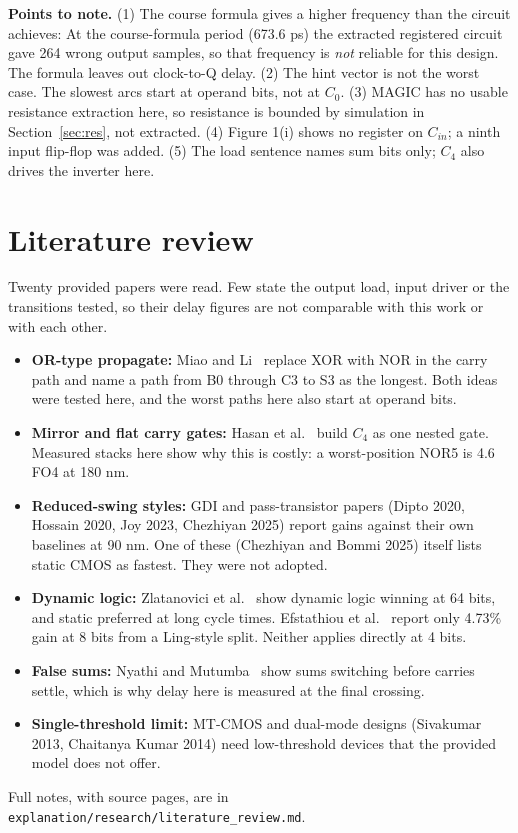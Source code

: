 \documentclass[10pt,a4paper]{article}
\begin{document}
\noindent\textbf{Points to note.} (1) The course formula gives a higher frequency than the circuit achieves: At the course-formula period (673.6 ps) the extracted registered circuit gave 264 wrong output samples, so that frequency is \emph{not} reliable for this design. The formula leaves out clock-to-Q delay. (2) The hint vector is not the worst case. The slowest arcs start at operand bits, not at $C_0$. (3) MAGIC has no usable resistance extraction here, so resistance is bounded by simulation in Section~\ref{sec:res}, not extracted. (4) Figure 1(i) shows no register on $C_{in}$; a ninth input flip-flop was added. (5) The load sentence names sum bits only; $C_4$ also drives the inverter here.

\section{Literature review}
Twenty provided papers were read. Few state the output load, input driver or the transitions tested, so their delay figures are not comparable with this work or with each other.
\begin{itemize}
\item \textbf{OR-type propagate:} Miao and Li~\cite{miao} replace XOR with NOR in the carry path and name a path from B0 through C3 to S3 as the longest. Both ideas were tested here, and the worst paths here also start at operand bits.
\item \textbf{Mirror and flat carry gates:} Hasan et al.~\cite{hasan} build $C_4$ as one nested gate. Measured stacks here show why this is costly: a worst-position NOR5 is 4.6 FO4 at 180 nm.
\item \textbf{Reduced-swing styles:} GDI and pass-transistor papers (Dipto 2020, Hossain 2020, Joy 2023, Chezhiyan 2025) report gains against their own baselines at 90 nm. One of these (Chezhiyan and Bommi 2025) itself lists static CMOS as fastest. They were not adopted.
\item \textbf{Dynamic logic:} Zlatanovici et al.~\cite{zlat} show dynamic logic winning at 64 bits, and static preferred at long cycle times. Efstathiou et al.~\cite{efst} report only 4.73\% gain at 8 bits from a Ling-style split. Neither applies directly at 4 bits.
\item \textbf{False sums:} Nyathi and Mutumba~\cite{nyathi} show sums switching before carries settle, which is why delay here is measured at the final crossing.
\item \textbf{Single-threshold limit:} MT-CMOS and dual-mode designs (Sivakumar 2013, Chaitanya Kumar 2014) need low-threshold devices that the provided model does not offer.
\end{itemize}
Full notes, with source pages, are in \texttt{explanation/research/literature\_review.md}.
\end{document}
